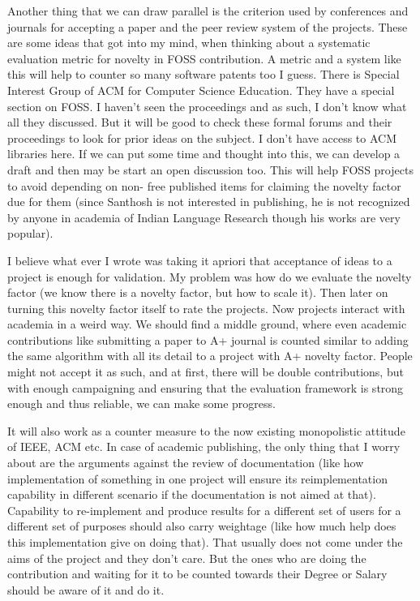 Another thing that we can draw parallel is the criterion used
by conferences and journals for accepting a paper and the peer review system
of the projects. These are some ideas that got into my mind, when thinking about a
systematic evaluation metric for novelty in FOSS contribution. A metric
and a system like this will help to counter so many software patents too I guess.
There is Special Interest Group of ACM for Computer Science Education.
They have a special section on FOSS. I haven't seen the proceedings and as such, I
don't know what all they discussed. But it will be good to check these
formal forums and their proceedings to look for prior ideas on the subject.
I don't have access to ACM libraries here. If we can put some time and
thought into this, we can develop a draft and then may be start an open
discussion too. This will help FOSS projects to avoid depending on non-
free published items for claiming the novelty factor due for them (since
Santhosh is not interested in publishing, he is not recognized by anyone
in academia of Indian Language Research though his works are very popular).


I believe what ever I wrote was taking it apriori that acceptance of ideas
to a project is enough for validation. My problem was how do we evaluate
the novelty factor (we know there is a novelty factor, but how to scale it).
Then later on turning this novelty factor itself to rate the projects.
Now projects interact with academia in a weird way. We should find a middle
ground, where even academic contributions like submitting a paper to A+
journal is counted similar to adding the same algorithm with all its detail
to a project with A+ novelty factor. People might not accept it as such,
and at first, there will be double contributions, but with enough campaigning
and ensuring that the evaluation framework is strong enough and thus reliable,
we can make some progress.

It will also work as a counter measure to the now existing
monopolistic attitude of IEEE, ACM etc. In case of academic publishing, the
only thing that I worry about are the arguments against the review of documentation 
(like how implementation of something in one project will ensure its
reimplementation capability in different scenario if the documentation
is not aimed at that). Capability to re-implement and produce results for
a different set of users for a different set of purposes should also carry
weightage (like how much help does this implementation give on doing that).
That usually does not come under the aims of the project and they don't care.
But the ones who are doing the contribution and waiting for it to be counted
towards their Degree or Salary should be aware of it and do it.


